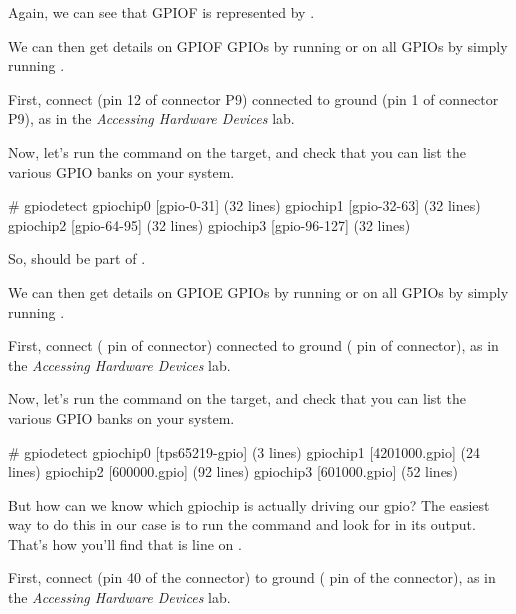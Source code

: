 Again, we can see that GPIOF is represented by .

We can then get details on GPIOF GPIOs by running
 or on all GPIOs by simply running
.
\fi

\if{}
First, connect  (pin 12 of connector P9) connected
to ground (pin 1 of connector P9), as in the
{\em Accessing Hardware Devices} lab.

Now, let's run the  command on the target, and check
that you can list the various GPIO banks on your system.

\begin{bashinput}
# gpiodetect
gpiochip0 [gpio-0-31] (32 lines)
gpiochip1 [gpio-32-63] (32 lines)
gpiochip2 [gpio-64-95] (32 lines)
gpiochip3 [gpio-96-127] (32 lines)
\end{bashinput}

So,  should be part of .

We can then get details on GPIOE GPIOs by running  or on all GPIOs by simply running .
\fi

\if{}

First, connect  ( pin of 
connector) connected to ground ( pin of 
connector), as in the {\em Accessing Hardware Devices} lab.

Now, let's run the  command on the target, and check
that you can list the various GPIO banks on your system.

\begin{bashinput}
# gpiodetect
gpiochip0 [tps65219-gpio] (3 lines)
gpiochip1 [4201000.gpio] (24 lines)
gpiochip2 [600000.gpio] (92 lines)
gpiochip3 [601000.gpio] (52 lines)
\end{bashinput}

But how can we know which gpiochip is actually driving our 
gpio?  The easiest way to do this in our case is to run the
 command and look for  in its
output. That's how you'll find that  is line  on
.
\fi

\if{}

First, connect  (pin 40 of the  connector)
to ground ( pin of the  connector), as in the
{\em Accessing Hardware Devices} lab.

